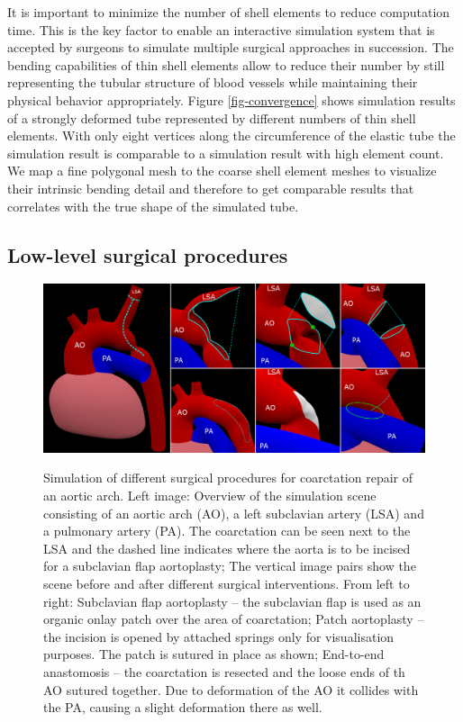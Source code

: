 It is important to minimize the number of shell elements to reduce computation time. This is the key factor to enable an interactive simulation system that is accepted by surgeons to simulate multiple surgical approaches in succession. The bending capabilities of thin shell elements allow to reduce their number by still representing the tubular structure of blood vessels while maintaining their physical behavior appropriately. Figure \ref{fig-convergence} shows simulation results of a strongly deformed tube represented by different numbers of thin shell elements. With only eight vertices along the circumference of the elastic tube the simulation result is comparable to a simulation result with high element count. We map a fine polygonal mesh to the coarse shell element meshes to visualize their intrinsic bending detail and therefore to get comparable results that correlates with the true shape of the simulated tube.

\subsection{Low-level surgical procedures}

\begin{figure}[tbh]
  \centering
  \includegraphics[width=\columnwidth]{img/surgery.png}
  \label{fig-surgery}
  \caption{Simulation of different surgical procedures for coarctation repair of an aortic arch. Left image: Overview of the simulation scene consisting of an aortic arch (AO), a left subclavian artery (LSA) and a pulmonary artery (PA). The coarctation can be seen next to the LSA and the dashed line indicates where the aorta is to be incised for a subclavian flap aortoplasty; The vertical image pairs show the scene before and after different surgical interventions. From left to right: Subclavian flap aortoplasty -- the subclavian flap is used as an organic onlay patch over the area of coarctation; Patch aortoplasty -- the incision is opened by attached springs only for visualisation purposes. The patch is sutured in place as shown; End-to-end anastomosis -- the coarctation is resected and the loose ends of th AO sutured together. Due to deformation of the AO it collides with the PA, causing a slight deformation there as well. }
\end{figure}

